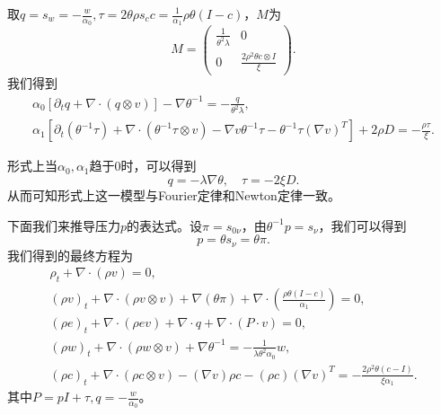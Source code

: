 	取$q=s_w=-\frac{ w}{\alpha_0},\tau = 2\theta \rho s_c c = \frac{1}{\alpha_1} \rho \theta (I-c)$，$M$为
	\begin{equation*}
		M = \left( \begin{array}{ccc} 
			\frac{1}{\theta^2 \lambda} & 0 \\
			0 &  \frac{2 \rho^2 \theta c \otimes I}{\xi}   
		\end{array} \right).
	\end{equation*}
	我们得到
	\begin{eqnarray*}
		\alpha_0 [\partial_t q +  \nabla \cdot (q \otimes v)] - \nabla \theta^{-1} = -\frac{q}{\theta^2 \lambda}, \\
		\alpha_1[\partial_t (\theta^{-1} {\tau}) + \nabla \cdot (\theta^{-1} {\tau} \otimes v) - \nabla v \theta^{-1} \tau - \theta^{-1}\tau (\nabla v)^T] + 2 \rho D = -\frac{{\rho \tau}}{\xi}.
	\end{eqnarray*}
	
	形式上当$\alpha_0, \alpha_1$趋于0时，可以得到
	\begin{equation*}
		q = -\lambda \nabla \theta, \quad \tau = - 2 \xi {D} .
	\end{equation*}
	从而可知形式上这一模型与Fourier定律和Newton定律一致。
	
	下面我们来推导压力$p$的表达式。设$\pi= s_{0\nu}$，由$\theta^{-1} p = s_\nu$，我们可以得到
	\begin{equation*}
		p = \theta s_\nu = \theta \pi . 
	\end{equation*}
	我们得到的最终方程为 
	\begin{subequations} \label{eq:genUCM}
		\begin{align}
			\rho_t + \nabla \cdot (\rho v) = 0 ,\\
			(\rho v)_t + \nabla \cdot (\rho v \otimes v) + \nabla (\theta \pi)  + \nabla \cdot ( \frac{\rho \theta(I-c)}{\alpha_1}) =0 ,\\
			(\rho e)_t + \nabla \cdot (\rho e v) + \nabla \cdot q + \nabla \cdot (P \cdot v) = 0, \\
			(\rho w)_t + \nabla \cdot (\rho w \otimes v) + \nabla \theta^{-1} = -\frac{1}{\lambda \theta^2 \alpha_0} w, \\
			(\rho c)_t +  \nabla \cdot (\rho c \otimes v) - (\nabla v) \rho c - (\rho c) (\nabla v)^T  = -\frac{2 \rho^2 \theta (c-I) }{\xi \alpha_1}.
		\end{align}
	\end{subequations}
	其中$P = pI + \tau,q =-\frac{w}{\alpha_0}$。

